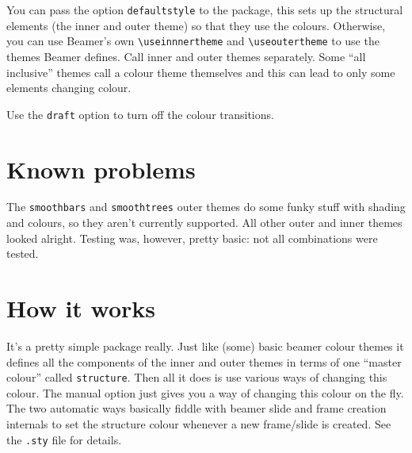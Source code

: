 \documentclass{scrartcl}
\begin{document}
You can pass the option \lstinline+defaultstyle+ to the package, this sets up the structural elements (the inner and outer theme) so that they use the colours.
Otherwise, you can use Beamer's own \lstinline+\useinnnertheme+ and \lstinline+\useoutertheme+ to use the themes Beamer defines.
Call inner and outer themes separately.
Some ``all inclusive'' themes call a colour theme themselves and this can lead to only some elements changing colour.

Use the \lstinline+draft+ option to turn off the colour transitions.

\section{Known problems}

The \lstinline+smoothbars+ and \lstinline+smoothtrees+ outer themes do some funky stuff with shading and colours, so they aren't currently supported.
All other outer and inner themes looked alright.
Testing was, however, pretty basic: not all combinations were tested.

\section{How it works}

It's a pretty simple package really.
Just like (some) basic beamer colour themes it defines all the components of the inner and outer themes 
  in terms of one ``master colour'' called \lstinline+structure+.
Then all it does is use various ways of changing this colour.
The manual option just gives you a way of changing this colour on the fly.
The two automatic ways basically fiddle with beamer slide and frame creation internals to set the structure colour whenever a new frame/slide is created.
See the \lstinline+.sty+ file for details.
\end{document}
